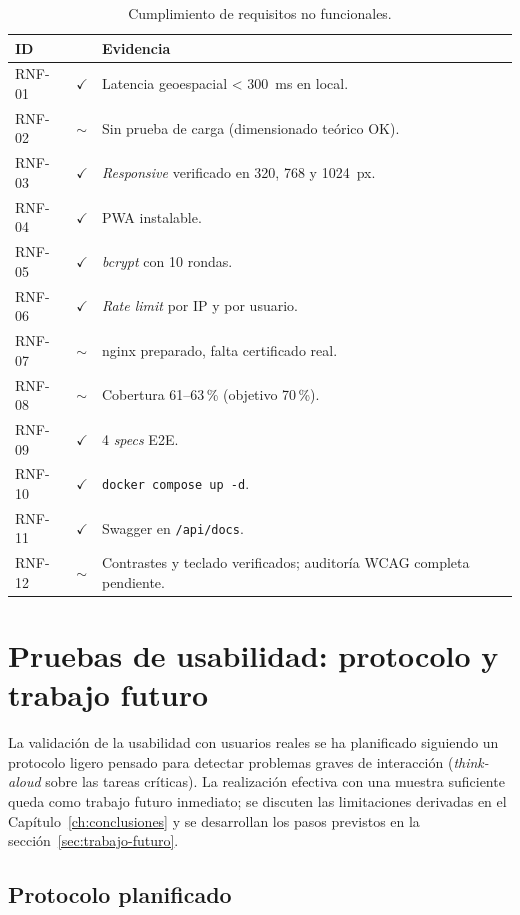 \begin{table}[H]
\centering
\caption{Cumplimiento de requisitos no funcionales.}
\label{tab:validacion-rnf}
\small
\begin{tabular}{@{}L{1.5cm}L{1cm}L{10cm}@{}}
\toprule
\textbf{ID} & \textbf{} & \textbf{Evidencia} \\
\midrule
RNF-01 & $\checkmark$ & Latencia geoespacial < 300~ms en local. \\
RNF-02 & $\sim$ & Sin prueba de carga (dimensionado teórico OK). \\
RNF-03 & $\checkmark$ & \textit{Responsive} verificado en 320, 768 y 1024~px. \\
RNF-04 & $\checkmark$ & PWA instalable. \\
RNF-05 & $\checkmark$ & \textit{bcrypt} con 10 rondas. \\
RNF-06 & $\checkmark$ & \textit{Rate limit} por IP y por usuario. \\
RNF-07 & $\sim$ & nginx preparado, falta certificado real. \\
RNF-08 & $\sim$ & Cobertura 61--63\,\% (objetivo 70\,\%). \\
RNF-09 & $\checkmark$ & 4 \textit{specs} E2E. \\
RNF-10 & $\checkmark$ & \texttt{docker compose up -d}. \\
RNF-11 & $\checkmark$ & Swagger en \texttt{/api/docs}. \\
RNF-12 & $\sim$ & Contrastes y teclado verificados; auditoría WCAG completa pendiente. \\
\bottomrule
\end{tabular}
\end{table}


\section{Pruebas de usabilidad: protocolo y trabajo futuro}
\label{sec:usabilidad}

La validación de la usabilidad con usuarios reales se ha planificado siguiendo un protocolo ligero pensado para detectar problemas graves de interacción (\textit{think-aloud} sobre las tareas críticas). La realización efectiva con una muestra suficiente queda como trabajo futuro inmediato; se discuten las limitaciones derivadas en el Capítulo~\ref{ch:conclusiones} y se desarrollan los pasos previstos en la sección~\ref{sec:trabajo-futuro}.

\subsection*{Protocolo planificado}

